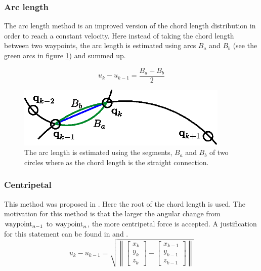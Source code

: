 \subsubsection{Arc length}
The arc length method is an improved version of the chord length distribution in order to reach a constant velocity. Here instead of taking the chord length between two waypoints, the arc length is estimated using arcs $B_a$ and $B_b$ (see the green arcs in figure \ref{fig:arcLength}) and summed up. %

\begin{equation*}
u_k-u_{k-1}=\frac{B_a+B_b}{2}
\end{equation*}

\begin{figure}[H]
	\centering
    \includegraphics[width = 0.9\textwidth]{graphics/arcLength.eps}
  \caption{The arc length is estimated using the segments, $B_a$ and $B_b$ of two circles where as the chord length is the straight connection.}
  \label{fig:arcLength}
\end{figure}




\subsubsection{Centripetal}
This method was proposed in \cite{lee}. Here the root of the chord length is used. The motivation for this method is that the larger the angular change from $\textnormal{waypoint}_{n-1}$ to $\textnormal{waypoint}_n$, the more centripetal force is accepted. A justification for this statement can be found in \cite{doessegger} and \cite{lee}.
\begin{equation*}
u_k-u_{k-1}=\sqrt{\left \| \begin{bmatrix}x_k\\y_k\\z_k \end{bmatrix}-\begin{bmatrix}x_{k-1}\\y_{k-1}\\z_{k-1} \end{bmatrix}\right \|}
\end{equation*}

